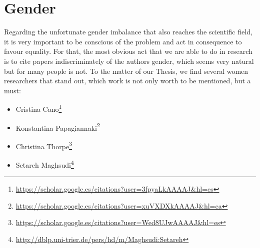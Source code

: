 \documentclass[12pt, a4paper,twoside]{article}
\begin{document}
	\section{Gender}
	\label{section:gender}	
	Regarding the unfortunate gender imbalance that also reaches the scientific field, it is very important to be conscious of the problem and act in consequence to favour equality. For that, the most obvious act that we are able to do in research is to cite papers indiscriminately of the authors gender, which seems very natural but for many people is not. To the matter of our Thesis, we find several women researchers that stand out, which work is not only worth to be mentioned, but a must: 
	\begin{itemize}
		\item Cristina Cano\footnote{\url{https://scholar.google.es/citations?user=3fpyaLkAAAAJ&hl=es}}
		\item Konstantina Papagiannaki\footnote{\url{https://scholar.google.es/citations?user=xuVXDXkAAAAJ&hl=ca}}
		\item Christina Thorpe\footnote{\url{https://scholar.google.es/citations?user=Wed8UJwAAAAJ&hl=es}}
		\item Setareh Maghsudi\footnote{\url{http://dblp.uni-trier.de/pers/hd/m/Maghsudi:Setareh}}
	\end{itemize}	
			
	
	
\end{document}
